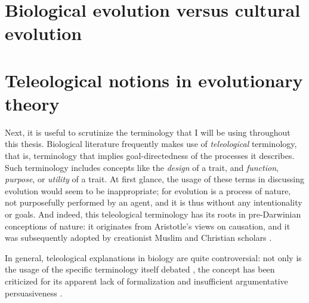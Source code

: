 \section{Biological evolution versus cultural evolution}
\label{sec:culture}

\section{Teleological notions in evolutionary theory}
\label{sec:teleology}
Next, it is useful to scrutinize the terminology that I will be using throughout this thesis.
Biological literature frequently makes use of \emph{teleological} terminology, that is, terminology that implies goal-directedness of the processes it describes. Such terminology includes concepts like the \emph{design} of a trait, and \emph{function}, \emph{purpose}, or \emph{utility} of a trait.
At first glance, the usage of these terms in discussing evolution would seem to be inappropriate; for evolution is a process of nature, not purposefully performed by an agent, and it is thus without any intentionality or goals.
And indeed, this teleological terminology has its roots in pre-Darwinian conceptions of nature: it originates from Aristotle's views on causation, and it was subsequently adopted by creationist Muslim and Christian scholars \citep{Johnson05}.

In general, teleological explanations in biology are quite controversial: not only is the usage of the specific terminology itself debated \citep[p.~27 and references therein]{Ayala99}, the concept has been criticized for its apparent lack of formalization and insufficient argumentative persuasiveness \citep[p.~83]{Baedke2021}.

